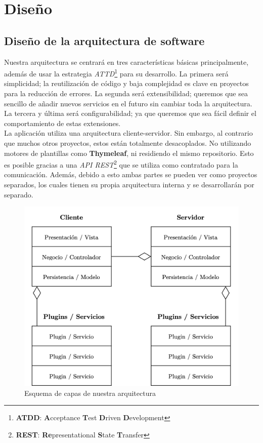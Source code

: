 \documentclass[../ei103948-project-documentation.tex]{subfiles}
\begin{document}
\section{Diseño}

\subsection{Diseño de la arquitectura de software}
    Nuestra arquitectura se centrará en tres características básicas principalmente, además de usar la estrategia \textit{ATTD}\footnote{\textbf{ATDD}: \textbf{A}cceptance \textbf{T}est \textbf{D}riven \textbf{D}evelopment} para su desarrollo. La primera será simplicidad; la reutilización de código y baja complejidad es clave en proyectos para la reducción de errores. La segunda será extensibilidad; queremos que sea sencillo de añadir nuevos servicios en el futuro sin cambiar toda la arquitectura. La tercera y última será configurabilidad; ya que queremos que sea fácil definir el comportamiento de estas extensiones.\\

    La aplicación utiliza una arquitectura \cite{granell-estilosarquitectura} cliente-servidor. Sin embargo, al contrario que muchos otros proyectos, estos están totalmente desacoplados. No utilizando motores de plantillas como \textbf{Thymeleaf}, ni residiendo el mismo repositorio. Esto es posible gracias a una \textit{API REST}\footnote{\textbf{REST}: \textbf{Re}presentational \textbf{S}tate \textbf{T}ransfer} que se utiliza como contratado para la comunicación. Además, debido a esto ambas partes se pueden ver como proyectos separados, los cuales tienen su propia arquitectura interna y se desarrollarán por separado.\\

    \begin{figure}[H]
        \begin{center}
        \includegraphics[scale=0.20]{images/DisenyoArquitecturaSoftware.png}
        \end{center}
        \caption{Esquema de capas de nuestra arquitectura}
    \end{figure}
\end{document}
